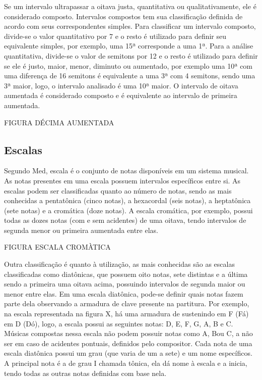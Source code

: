         Se um intervalo ultrapassar a oitava justa, quantitativa ou qualitativamente, ele é considerado composto. Intervalos compostos tem sua classificação definida de acordo com seus correspondentes simples. Para classificar um intervalo composto, divide-se o valor quantitativo por 7 e o resto é utilizado para definir seu equivalente simples, por exemplo, uma 15ª corresponde a uma 1ª. Para a análise quantitativa, divide-se o valor de semitons por 12 e o resto é utilizado para definir se ele é justo, maior, menor, diminuto ou aumentado, por exemplo uma 10ª com uma diferença de 16 semitons é equivalente a uma 3ª com 4 semitons, sendo uma 3ª maior, logo, o intervalo analisado é uma 10ª maior. O intervalo de oitava aumentada é considerado composto e é equivalente ao intervalo de primeira aumentada.

        FIGURA DÉCIMA AUMENTADA

    \subsection[Escalas]{Escalas}

      Segundo Med, escala é o conjunto de notas disponíveis em um sistema musical. As notas presentes em uma escala possuem intervalos específicos entre si. As escalas podem ser classificadas quanto ao número de notas, sendo as mais conhecidas a pentatônica (cinco notas), a hexacordal (seis notas), a heptatônica (sete notas) e a cromática (doze notas). A escala cromática, por exemplo, possui todas as dozes notas (com e sem acidentes) de uma oitava, tendo intervalos de segunda menor ou primeira aumentada entre elas.

      FIGURA ESCALA CROMÀTICA

      Outra classificação é quanto à utilização, as mais conhecidas são as escalas classificadas como diatônicas, que possuem oito notas, sete distintas e a última sendo a primeira uma oitava acima, possuindo intervalos de segunda maior ou menor entre elas. Em uma escala diatônica, pode-se definir quais notas fazem parte dela observando a armadura de clave presente na partitura. Por exemplo, na escala representada na figura X, há uma armadura de sustenindo em F (Fá) em D (Dó), logo, a escala possui as seguintes notas: D, E, F\sh, G, A, B e C\sh. Músicas compostas nessa escala não podem possuir notas como A\fl, B\sh ou C, a não ser em caso de acidentes pontuais, definidos pelo compositor. Cada nota de uma escala diatônica possui um grau (que varia de um a sete) e um nome específicos. A principal nota é a de grau I chamada tônica, ela dá nome à escala e a inicia, tendo todas as outras notas definidas com base nela.

